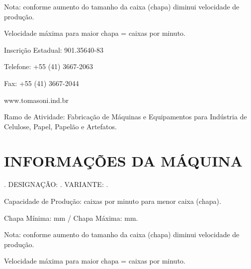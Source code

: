 Nota: conforme aumento do tamanho da caixa (chapa) diminui velocidade de produção.

Velocidade máxima para maior chapa = \productionCapacitymaximumSheet \space caixas por minuto.

Inscrição Estadual: 901.35640-83

Telefone: +55 (41) 3667-2063

Fax: +55 (41) 3667-2044

www.tomasoni.ind.br

Ramo de Atividade: Fabricação de Máquinas e Equipamentos para Indústria de Celulose, Papel, Papelão e Artefatos.

\section{\large{INFORMAÇÕES DA MÁQUINA}}

\machineName \space. DESIGNAÇÃO: \machineShortName. VARIANTE: \variant.

Capacidade de Produção: \productionCapacityminimumSheet \space caixas por minuto para menor caixa (chapa).

Chapa Mínima: \minimumSheet mm / Chapa Máxima: \maximumSheet mm.

Nota: conforme aumento do tamanho da caixa (chapa) diminui velocidade de produção.

Velocidade máxima para maior chapa = \productionCapacitymaximumSheet \space caixas por minuto.

